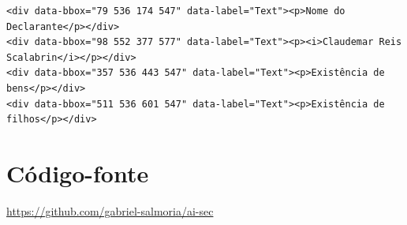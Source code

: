 \documentclass[12pt,a4paper]{article}
\begin{document}
{\scriptsize
\begin{verbatim}
<div data-bbox="79 536 174 547" data-label="Text"><p>Nome do Declarante</p></div>
<div data-bbox="98 552 377 577" data-label="Text"><p><i>Claudemar Reis Scalabrin</i></p></div>
<div data-bbox="357 536 443 547" data-label="Text"><p>Existência de bens</p></div>
<div data-bbox="511 536 601 547" data-label="Text"><p>Existência de filhos</p></div>
\end{verbatim}
}

\section{Código-fonte}
\label{app:codigo}

\url{https://github.com/gabriel-salmoria/ai-sec}
\end{document}

